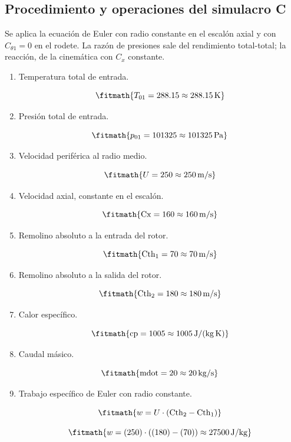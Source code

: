 \subsection*{Procedimiento y operaciones del simulacro C}
Se aplica la ecuación de Euler con radio constante en el escalón axial y con $C_{\theta1}=0$ en el rodete. La razón de presiones sale del rendimiento total-total; la reacción, de la cinemática con $C_x$ constante.

\begin{enumerate}

\item Temperatura total de entrada.

\[\fitmath{T_{01}=288.15\approx 288.15\,\mathrm{K}}\]

\item Presión total de entrada.

\[\fitmath{p_{01}=101325\approx 101325\,\mathrm{Pa}}\]

\item Velocidad periférica al radio medio.

\[\fitmath{U=250\approx 250\,\mathrm{m/s}}\]

\item Velocidad axial, constante en el escalón.

\[\fitmath{\mathrm{Cx}=160\approx 160\,\mathrm{m/s}}\]

\item Remolino absoluto a la entrada del rotor.

\[\fitmath{\mathrm{Cth}_{1}=70\approx 70\,\mathrm{m/s}}\]

\item Remolino absoluto a la salida del rotor.

\[\fitmath{\mathrm{Cth}_{2}=180\approx 180\,\mathrm{m/s}}\]

\item Calor específico.

\[\fitmath{\mathrm{cp}=1005\approx 1005\,\mathrm{J/(kg\,K)}}\]

\item Caudal másico.

\[\fitmath{\mathrm{mdot}=20\approx 20\,\mathrm{kg/s}}\]

\item Trabajo específico de Euler con radio constante.

\[\fitmath{w=U\cdot \left(\mathrm{Cth}_{2}-\mathrm{Cth}_{1}\right)}\]

\[\fitmath{w=(250)\cdot \left((180)-(70)\right)\approx 27500\,\mathrm{J/kg}}\]


\end{enumerate}
